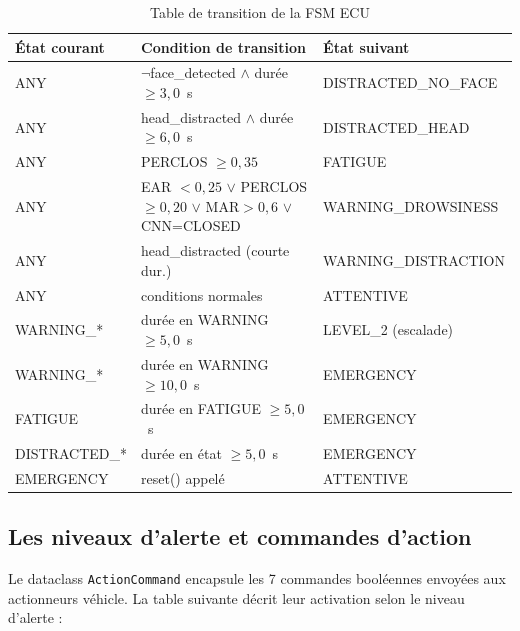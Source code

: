 \documentclass[12pt,a4paper]{report}
\begin{document}
\begin{table}[H]
\centering
\caption{Table de transition de la FSM ECU}
\label{tab:fsm_transitions}
\begin{tabular}{L{3.5cm} L{5.5cm} L{3.8cm}}
\toprule
\textbf{\'Etat courant} & \textbf{Condition de transition} & \textbf{\'Etat suivant} \\
\midrule
ANY & $\neg$face\_detected $\wedge$ dur\'ee $\geq 3{,}0$~s & DISTRACTED\_NO\_FACE \\
ANY & head\_distracted $\wedge$ dur\'ee $\geq 6{,}0$~s & DISTRACTED\_HEAD \\
ANY & PERCLOS $\geq 0{,}35$ & FATIGUE \\
ANY & EAR $< 0{,}25$ $\vee$ PERCLOS$\geq0{,}20$ $\vee$ MAR$>0{,}6$ $\vee$ CNN=CLOSED & WARNING\_DROWSINESS \\
ANY & head\_distracted (courte dur.) & WARNING\_DISTRACTION \\
ANY & conditions normales & ATTENTIVE \\
WARNING\_* & dur\'ee en WARNING $\geq 5{,}0$~s & LEVEL\_2 (escalade) \\
WARNING\_* & dur\'ee en WARNING $\geq 10{,}0$~s & EMERGENCY \\
FATIGUE & dur\'ee en FATIGUE $\geq 5{,}0$~s & EMERGENCY \\
DISTRACTED\_* & dur\'ee en \'etat $\geq 5{,}0$~s & EMERGENCY \\
EMERGENCY & reset() appel\'e & ATTENTIVE \\
\bottomrule
\end{tabular}
\end{table}

\subsection{Les niveaux d'alerte et commandes d'action}

Le dataclass \texttt{ActionCommand} encapsule les 7 commandes bool\'eennes envoy\'ees aux actionneurs v\'ehicle. La table suivante d\'ecrit leur activation selon le niveau d'alerte :
\end{document}
